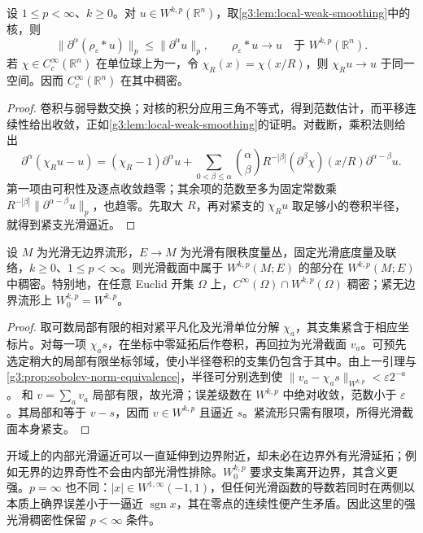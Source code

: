 \begin{lemma}\label{g3:lem:mollifier-approximation}
	设 \(1\le p<\infty\)、\(k\ge0\)。对 \(u\in W^{k,p}(\mathbb R^n)\)，取\cref{g3:lem:local-weak-smoothing}中的核，则
	\[
		\|\partial^\alpha(\rho_\varepsilon*u)\|_p\le\|\partial^\alpha u\|_p,
		\qquad\rho_\varepsilon*u\longrightarrow u\quad\text{于 }W^{k,p}(\mathbb R^n).
	\]
	若 \(\chi\in C_c^\infty(\mathbb R^n)\) 在单位球上为一，令 \(\chi_R(x)=\chi(x/R)\)，则 \(\chi_Ru\to u\) 于同一空间。因而 \(C_c^\infty(\mathbb R^n)\) 在其中稠密。
\end{lemma}
\begin{proof}
	卷积与弱导数交换；对核的积分应用三角不等式，得到范数估计，而平移连续性给出收敛，正如\cref{g3:lem:local-weak-smoothing}的证明。对截断，乘积法则给出
	\[
		\partial^\alpha(\chi_Ru-u)
		=(\chi_R-1)\partial^\alpha u
		+\sum_{0<\beta\le\alpha}\binom\alpha\beta
		R^{-|\beta|}(\partial^\beta\chi)(x/R)\partial^{\alpha-\beta}u.
	\]
	第一项由可积性及逐点收敛趋零；其余项的范数至多为固定常数乘 \(R^{-|\beta|}\|\partial^{\alpha-\beta}u\|_p\)，也趋零。先取大 \(R\)，再对紧支的 \(\chi_Ru\) 取足够小的卷积半径，就得到紧支光滑逼近。
\end{proof}

\begin{theorem}\label{g3:thm:sobolev-smooth-density}
	设 \(M\) 为光滑无边界流形，\(E\to M\) 为光滑有限秩度量丛，固定光滑底度量及联络，\(k\ge0\)、\(1\le p<\infty\)。则光滑截面中属于 \(W^{k,p}(M;E)\) 的部分在 \(W^{k,p}(M;E)\) 中稠密。特别地，在任意 Euclid 开集 \(\Omega\) 上，\(C^\infty(\Omega)\cap W^{k,p}(\Omega)\) 稠密；紧无边界流形上 \(W^{k,p}_0=W^{k,p}\)。
\end{theorem}
\begin{proof}
	取可数局部有限的相对紧平凡化及光滑单位分解 \(\chi_a\)，其支集紧含于相应坐标片。对每一项 \(\chi_as\)，在坐标中零延拓后作卷积，再回拉为光滑截面 \(v_a\)。可预先选定稍大的局部有限坐标邻域，使小半径卷积的支集仍包含于其中。由上一引理与\cref{g3:prop:sobolev-norm-equivalence}，半径可分别选到使
	\(\|v_a-\chi_as\|_{W^{k,p}}<\varepsilon2^{-a}\)。
	和 \(v=\sum_av_a\) 局部有限，故光滑；误差级数在 \(W^{k,p}\) 中绝对收敛，范数小于 \(\varepsilon\)。其局部和等于 \(v-s\)，因而 \(v\in W^{k,p}\) 且逼近 \(s\)。紧流形只需有限项，所得光滑截面本身紧支。
\end{proof}

开域上的内部光滑逼近可以一直延伸到边界附近，却未必在边界外有光滑延拓；例如无界的边界奇性不会由内部光滑性排除。\(W^{k,p}_0\) 要求支集离开边界，其含义更强。\(p=\infty\) 也不同：\(|x|\in W^{1,\infty}(-1,1)\)，但任何光滑函数的导数若同时在两侧以本质上确界误差小于一逼近 \(\operatorname{sgn}x\)，其在零点的连续性便产生矛盾。因此这里的强光滑稠密性保留 \(p<\infty\) 条件。

